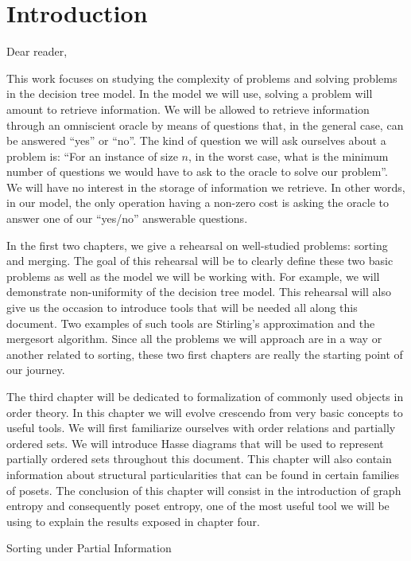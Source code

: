 \setcounter{chapter}{-1}
\chapter{Introduction}


Dear reader,


This work focuses on studying the complexity of problems and solving problems
in the decision tree model. In the model we will use, solving a problem will
amount to retrieve information. We will be allowed to retrieve information
through an omniscient oracle by means of questions that, in the general case,
can be answered ``yes'' or ``no''. The kind of question we will ask ourselves
about a problem is: ``For an instance of size \(n\), in the worst case, what is
the minimum number of questions we would have to ask to the oracle to solve our
problem''. We will have no interest in the storage of information we retrieve.
In other words, in our model, the only operation having a non-zero cost is
asking the oracle to answer one of our ``yes/no'' answerable questions.


In the first two chapters, we give a rehearsal on well-studied problems:
sorting and merging. The goal of this rehearsal will be to clearly define these
two basic problems as well as the model we will be working with. For example,
we will demonstrate non-uniformity of the decision tree model. This rehearsal
will also give us the occasion to introduce tools that will be needed all along
this document. Two examples of such tools are Stirling's approximation and the
mergesort algorithm.  Since all the problems we will approach are in a way or
another related to sorting, these two first chapters are really the starting
point of our journey.


The third chapter will be dedicated to formalization of commonly used objects
in order theory. In this chapter we will evolve crescendo from very basic
concepts to useful tools. We will first familiarize ourselves with order
relations and partially ordered sets. We will introduce Hasse diagrams that
will be used to represent partially ordered sets throughout this document.
This chapter will also contain information about structural particularities
that can be found in certain families of posets. The conclusion of this
chapter will consist in the introduction of graph entropy and consequently
poset entropy, one of the most useful tool we will be using to explain the
results exposed in chapter four.


Sorting under Partial Information

